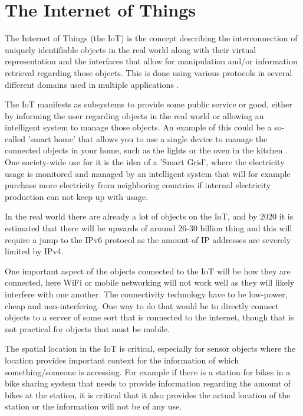 \section{The Internet of Things}
The Internet of Things (the IoT) is the concept describing the interconnection of uniquely identifiable objects in the real world along with their virtual representation and the interfaces that allow for manipulation and/or information retrieval regarding those objects. This is done using various protocols in several different domains used in multiple applications \citep{misc:InternetOfThingsDefinition} \citep{misc:InternetOfThingsDefinition2} \citep{misc:InternetOfThingsDefinition3}.

The IoT manifests as subsystems to provide some public service or good, either by informing the user regarding objects in the real world or allowing an intelligent system to manage those objects. An example of this could be a so-called 'smart home' that allows you to use a single device to manage the connected objects in your home, such as the lights or the oven in the kitchen \citep{misc:InternetOfThingsExamples}. One society-wide use for it is the idea of a 'Smart Grid', where the electricity usage is monitored and managed by an intelligent system that will for example purchase more electricity from neighboring countries if internal electricity production can not keep up with usage.

In the real world there are already a lot of objects on the IoT, and by 2020 it is estimated that there will be upwards of around 26-30 billion thing \citep{misc:IoTGrowth1}\citep{misc:IoTGrowth2} and this will require a jump to the IPv6 protocol as the amount of IP addresses are severely limited by IPv4\citep{misc:numberOfAddresses}.

One important aspect of the objects connected to the IoT will be how they are connected, here WiFi or mobile networking will not work well as they will likely interfere with one another. The connectivity technology have to be low-power, cheap and non-interfering. One way to do that would be to directly connect objects to a server of some sort that is connected to the internet, though that is not practical for objects that must be mobile. 

The spatial location in the IoT is critical, especially for sensor objects where the location provides important context for the information of which something/someone is accessing. For example if there is a station for bikes in a bike sharing system that needs to provide information regarding the amount of bikes at the station, it is critical that it also provides the actual location of the station or the information will not be of any use.